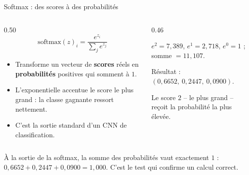 \begin{frame}{Softmax : des scores à des probabilités}
\begin{columns}[t]
\begin{column}{0.50\textwidth}
\[
\mathrm{softmax}(z)_i = \frac{e^{z_i}}{\sum_{j} e^{z_j}}
\]
\begin{itemize}
  \item Transforme un vecteur de \textbf{scores} réels en \textbf{probabilités}
  positives qui somment à $1$.
  \item L'exponentielle accentue le score le plus grand : la classe gagnante
  ressort nettement.
  \item C'est la sortie standard d'un CNN de classification.
\end{itemize}
\end{column}
\begin{column}{0.46\textwidth}
\begin{ebox}
$e^{2} = 7{,}389$, $e^{1} = 2{,}718$, $e^{0} = 1$ ; somme $= 11{,}107$.

\medskip
Résultat : $(0{,}6652,\ 0{,}2447,\ 0{,}0900)$.

\medskip
Le score $2$ -- le plus grand -- reçoit la probabilité la plus élevée.
\end{ebox}
\end{column}
\end{columns}
\vspace{1mm}
\begin{kbox}[Vérification]
À la sortie de la softmax, la somme des probabilités vaut exactement $1$ :
$0{,}6652 + 0{,}2447 + 0{,}0900 = 1{,}000$. C'est le test qui confirme un calcul correct.
\end{kbox}
\end{frame}

